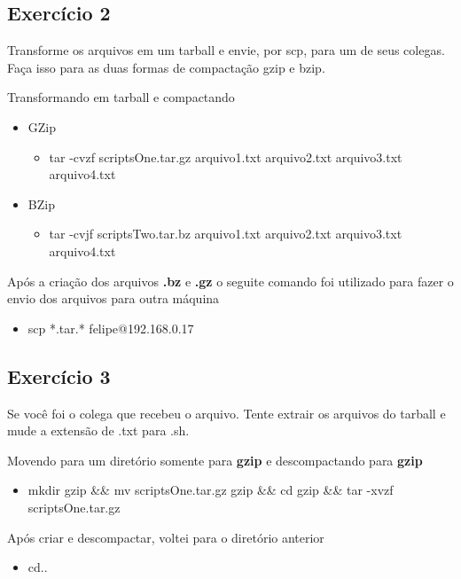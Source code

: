 \documentclass[
	12pt,				%
	openany,			%
	a4paper,			%
	chapter=TITLE,		%
	section=TITLE,		%
	english,
	brazil				%
]{abntex2}
\begin{document}
\subsection{Exercício 2}

Transforme  os  arquivos  em  um  tarball  e  envie, por scp, para um  de  seus  colegas. Faça isso para as duas formas de compactação gzip e bzip.

Transformando em tarball e compactando
\begin{itemize}
\item GZip
	\begin{itemize}
		\item tar -cvzf scriptsOne.tar.gz arquivo1.txt arquivo2.txt arquivo3.txt arquivo4.txt 
	\end{itemize}

\item BZip
	\begin{itemize}
		\item tar -cvjf scriptsTwo.tar.bz arquivo1.txt arquivo2.txt arquivo3.txt arquivo4.txt 
	\end{itemize}
\end{itemize}

Após a criação dos arquivos \textbf{.bz} e \textbf{.gz} o seguite comando foi utilizado para fazer o envio dos arquivos para outra máquina
\begin{itemize}
	\item scp *.tar.* felipe@192.168.0.17
\end{itemize}

\subsection{Exercício 3}

Se  você foi  o  colega que  recebeu  o  arquivo. Tente  extrair  os  arquivos  do  tarball  e mude a extensão de .txt para .sh.

Movendo para um diretório somente para \textbf{gzip} e descompactando para \textbf{gzip}

\begin{itemize}
	\item mkdir gzip \&\& mv scriptsOne.tar.gz gzip \&\& cd gzip \&\& tar -xvzf scriptsOne.tar.gz
\end{itemize}

Após criar e descompactar, voltei para o diretório anterior

\begin{itemize}
	\item cd..

\end{itemize}
\end{document}
